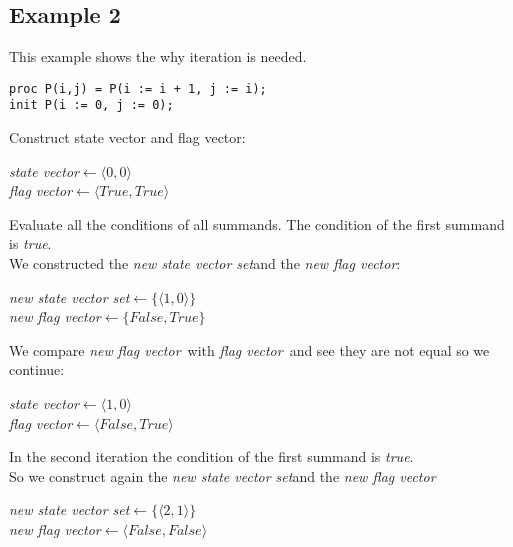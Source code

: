 \documentclass[a4paper,10pt]{article}
\theoremstyle{plain}
\theoremstyle{definition}
\newcommand{\ti}{\textit}
\newcommand{\sv}{\textit{state vector}}
\newcommand{\fv}{\textit{flag vector}}
\newcommand{\svs}{\textit{new state vector set}}
\newcommand{\nfv}{\textit{new flag vector}}
\newcommand{\la}{$\leftarrow$}
\begin{document}
\subsection{Example 2}
This example shows the why iteration is needed.
\begin{verbatim}
proc P(i,j) = P(i := i + 1, j := i);
init P(i := 0, j := 0); 
\end{verbatim}
 
Construct state vector and flag vector: 
\begin{center}\begin{minipage}{250pt}
\sv \la  $\langle 0 , 0 \rangle$\\
\fv \la  $\langle True , True \rangle$\\
\end{minipage}\end{center}

Evaluate all the conditions of all summands.
The condition of the first summand is \ti{true}.\\

We constructed the \svs and the \nfv :
\begin{center}\begin{minipage}{250pt}
\svs \la  $\lbrace \langle 1 , 0 \rangle \rbrace $\\
\nfv \la  $\lbrace False , True \rbrace $\\
\end{minipage}\end{center}

We compare \ti{new} \fv\ with \fv\ and see they are not equal so we continue:
\begin{center}\begin{minipage}{250pt}
\sv \la $\langle 1 , 0 \rangle $\\
\fv \la $\langle False , True \rangle $\\
\end{minipage}\end{center}

In the second iteration the condition of the first summand is \ti{true}.\\
So we construct again the \svs and the \nfv\: 
\begin{center}\begin{minipage}{250pt}
\svs \la  $\lbrace \langle 2 , 1 \rangle \rbrace $\\
\nfv \la  $\langle False , False \rangle $ \\
\end{minipage}\end{center}
\end{document}
